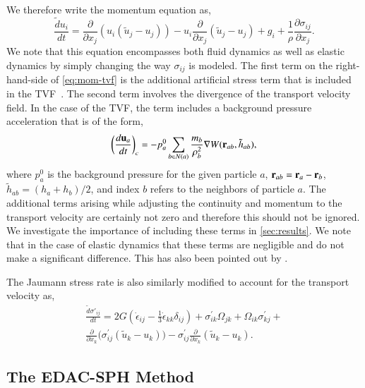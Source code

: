 %
We therefore write the momentum equation as,
\begin{equation}
  \label{eq:mom-tvf}
  \frac{\tilde{d} u_i}{d t} =
  \frac{\partial}{\partial x_j} (u_i (\tilde{u}_j - u_j))
  - u_i \frac{\partial}{\partial x_j} (\tilde{u}_j - u_j)
  + g_i
  +\frac{1}{\rho} \frac{\partial \sigma_{ij}}{\partial x_j}.
\end{equation}
We note that this equation encompasses both fluid dynamics as well as elastic
dynamics by simply changing the way $\sigma_{ij}$ is modeled. The first term
on the right-hand-side of \cref{eq:mom-tvf} is the additional artificial
stress term that is included in the TVF~\citep{Adami2013}. The second term
involves the divergence of the transport velocity field. In the case of the
TVF, the term includes a background pressure acceleration that is of the form,
\begin{equation}
  \label{eq:tvf-accel}
  \bigg(\frac{d \mathbf{u}_a}{dt}\bigg)_{c} = - p^0_a \sum_{b \in N(a)}
  \frac{m_b}{\rho_b^2} \nabla W(\mathbf{r}_{ab}, \tilde{h}_{ab}),
\end{equation}
where $p^0_a$ is the background pressure for the given particle $a$,
$\mathbf{r}_{ab} = \mathbf{r}_a - \mathbf{r}_b$, $\tilde{h}_{ab} = (h_a + h_b)/2$, and
index $b$ refers to the neighbors of particle $a$. The additional terms arising
while adjusting the continuity and momentum to the transport velocity are
certainly not zero and therefore this should not be ignored. We investigate the
importance of including these terms in \cref{sec:results}. We note that in the
case of elastic dynamics that these terms are negligible and do not make a
significant difference. This has also been pointed out by
\cite{zhang_hu_adams17}.

The Jaumann stress rate is also similarly modified to account for the
transport velocity as,
\begin{multline}
  \label{eq:modified-jaumann-stress-rate}
  \frac{\tilde{d} \sigma'_{ij}}{dt} = 2G (\dot{\epsilon}_{ij} - \frac{1}{3}
  \dot{\epsilon}_{kk} \delta_{ij}) + \sigma^{'}_{ik}  \Omega_{jk} +
  \Omega_{ik} \sigma^{'}_{kj} + \\
  \frac{\partial}{\partial x_k}\big(\sigma^{'}_{ij}  (\tilde{u}_k - u_k)\big)
  - \sigma^{'}_{ij} \frac{\partial}{\partial x_k} (\tilde{u}_k - u_k).
\end{multline}


\subsection{The EDAC-SPH Method}
\label{sec:edac-tvf}

